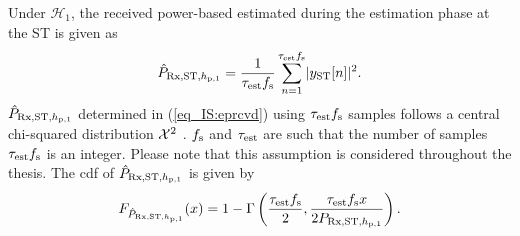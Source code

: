 Under $\mathcal H_1$, the received power-based estimated during the estimation phase at the ST is given as \cite{Urkowitz} 
\begin{align}
\hat{P}_{\text{Rx,ST,$h_{\text{p,1}}$}} = {\frac{1}{{\tau_{\text{est}} f_{\text{s}}}}\sum_{n=1}^{\tau_{\text{est}} f_{\text{s}}}} { |y_{\text{ST}}[n]|^2}.
\label{eq_IS:eprcvd} 
\end{align}
$\hat{P}_{\text{Rx,ST,$h_{\text{p,1}}$}}$ determined in (\ref{eq_IS:eprcvd}) using $\tau_{\text{est}} f_{\text{s}}$ samples follows a central chi-squared distribution $\cchi2$ \cite{Kay}. $f_{\text{s}}$ and $\tau_{\text{est}}$ are such that the number of samples $\tau_{\text{est}} f_{\text{s}}$ is an integer. Please note that this assumption is considered throughout the thesis. 
The cdf of $\hat{P}_{\text{Rx,ST,$h_{\text{p,1}}$}}$ is given by  
\begin{align}
F_{\hat{P}_{\text{Rx,ST,$h_{\text{p,1}}$}}}(x) = 1 - \Gamma\left(\frac{\tau_{\text{est}} f_{\text{s}}}{2}, \frac{ \tau_{\text{est}} f_{\text{s}} x}{2 P_{\text{Rx,ST,$h_{\text{p,1}}$}}}  \right). 
\label{eq_IS:dprcvd}
\end{align}


